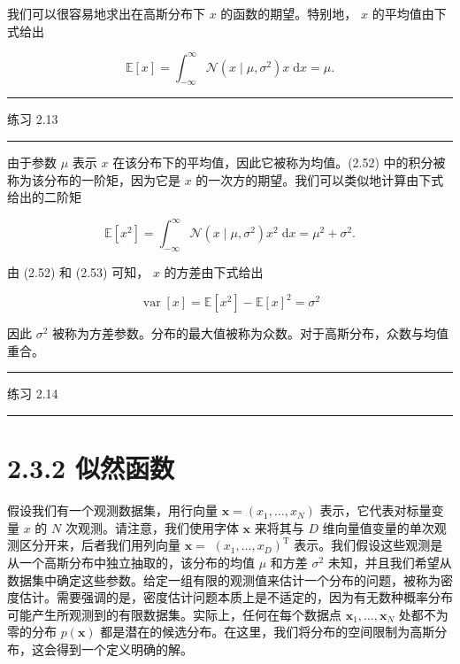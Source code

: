 \documentclass[10pt]{report}
\newcommand{\HRule}{\begin{center}\rule{0.9\linewidth}{0.2mm}\end{center}}
\begin{document}
我们可以很容易地求出在高斯分布下 \(x\) 的函数的期望。特别地， \(x\) 的平均值由下式给出

\[
\mathbb{E}\left\lbrack  x\right\rbrack   = {\int }_{-\infty }^{\infty }\mathcal{N}\left( {x \mid  \mu ,{\sigma }^{2}}\right) x\mathrm{\;d}x = \mu . \tag{2.52}
\]

\HRule

练习 2.13

\HRule

由于参数 \(\mu\) 表示 \(x\) 在该分布下的平均值，因此它被称为均值。(2.52) 中的积分被称为该分布的一阶矩，因为它是 \(x\) 的一次方的期望。我们可以类似地计算由下式给出的二阶矩

\[
\mathbb{E}\left\lbrack  {x}^{2}\right\rbrack   = {\int }_{-\infty }^{\infty }\mathcal{N}\left( {x \mid  \mu ,{\sigma }^{2}}\right) {x}^{2}\mathrm{\;d}x = {\mu }^{2} + {\sigma }^{2}. \tag{2.53}
\]

由 (2.52) 和 (2.53) 可知， \(x\) 的方差由下式给出

\[
\operatorname{var}\left\lbrack  x\right\rbrack   = \mathbb{E}\left\lbrack  {x}^{2}\right\rbrack   - \mathbb{E}{\left\lbrack  x\right\rbrack  }^{2} = {\sigma }^{2} \tag{2.54}
\]

因此 \({\sigma }^{2}\) 被称为方差参数。分布的最大值被称为众数。对于高斯分布，众数与均值重合。

\HRule

练习 2.14

\HRule

\section*{2.3.2 似然函数}

假设我们有一个观测数据集，用行向量 \(\mathbf{x} = \left( {{x}_{1},\ldots ,{x}_{N}}\right)\) 表示，它代表对标量变量 \(x\) 的 \(N\) 次观测。请注意，我们使用字体 \(\mathbf{x}\) 来将其与 \(D\) 维向量值变量的单次观测区分开来，后者我们用列向量 \(\mathbf{x} =\)  \({\left( {x}_{1},\ldots ,{x}_{D}\right) }^{\mathrm{T}}\) 表示。我们假设这些观测是从一个高斯分布中独立抽取的，该分布的均值 \(\mu\) 和方差 \({\sigma }^{2}\) 未知，并且我们希望从数据集中确定这些参数。给定一组有限的观测值来估计一个分布的问题，被称为密度估计。需要强调的是，密度估计问题本质上是不适定的，因为有无数种概率分布可能产生所观测到的有限数据集。实际上，任何在每个数据点 \({\mathbf{x}}_{1},\ldots ,{\mathbf{x}}_{N}\) 处都不为零的分布 \(p\left( \mathbf{x}\right)\) 都是潜在的候选分布。在这里，我们将分布的空间限制为高斯分布，这会得到一个定义明确的解。
\end{document}
